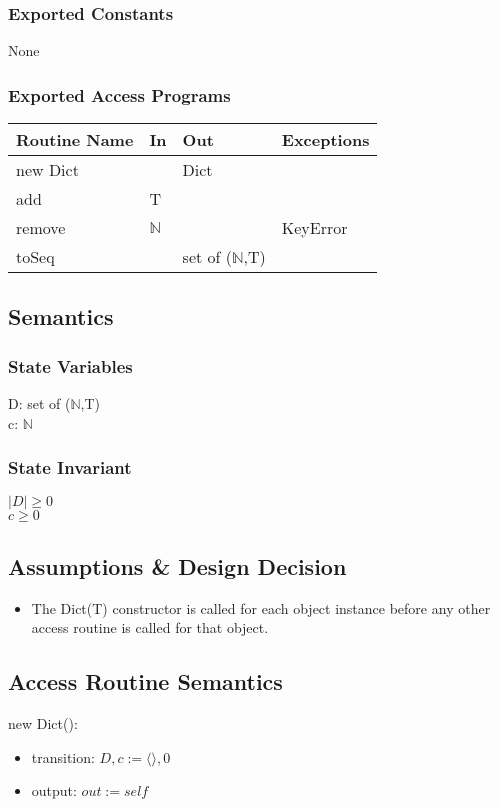 \documentclass[12pt, titlepage]{article}
\begin{document}
\subsubsection*{Exported Constants}
None
\subsubsection* {Exported Access Programs}
\begin{tabular}{|p{3cm}|p{3cm}|p{3cm}|p{4.5cm}|}
    \hline
    \textbf{Routine Name} & \textbf{In} & \textbf{Out} & \textbf{Exceptions} \\
    \hline
    new Dict & & Dict &\\
    \hline
    add & T & &\\
    \hline
    remove & $\mathbb{N}$ & & KeyError\\
    \hline
    toSeq & & set of ($\mathbb{N}$,T) & \\
    \hline
\end{tabular}

\subsection*{Semantics}
\subsubsection*{State Variables}
D: set of ($\mathbb{N}$,T) \\
c: $\mathbb{N}$
\subsubsection*{State Invariant}
$|D| \geq 0$\\
$c \geq 0$

\subsection*{Assumptions \& Design Decision}
\begin{itemize}
  \item The Dict(T) constructor is called for each object instance before any other access routine is called for that object.
\end{itemize}

\subsection*{Access Routine Semantics}
\noindent new Dict():
\begin{itemize}
    \item transition: $D, c := \langle \rangle, 0$
    
    \item output: $out := self$
\end{itemize}
\end{document}
